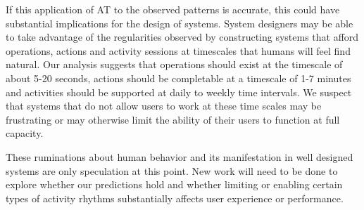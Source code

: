 If this application of AT to the observed patterns is accurate, this could have substantial implications for the design of systems.  System designers may be able to take advantage of the regularities observed by constructing systems that afford operations, actions and activity sessions at timescales that humans will feel find natural.  Our analysis suggests that operations should exist at the timescale of about 5-20 seconds, actions should be completable at a timescale of 1-7 minutes and activities should be supported at daily to weekly time intervals.  We suspect that systems that do not allow users to work at these time scales may be frustrating or may otherwise limit the ability of their users to function at full capacity.

These ruminations about human behavior and its manifestation in well designed systems are only speculation at this point.  New work will need to be done to explore whether our predictions hold and whether limiting or enabling certain types of activity rhythms substantially affects user experience or performance.
